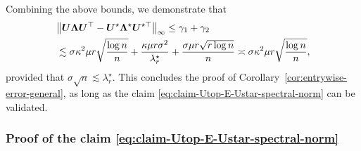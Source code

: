 



Combining the above bounds, we demonstrate that
%
\begin{align}
	& \big\|\bm{U}\bm{\Lambda}\bm{U}^{\top}-\bm{U}^{\star}\bm{\Lambda}^{\star}\bm{U}^{\star\top} \big\|_{\infty}
	\leq\gamma_{1}+\gamma_{2} \notag\\
& \lesssim\sigma\kappa^{2}\mu r\sqrt{\frac{\log n}{n}}+\frac{\kappa\mu r\sigma^{2}}{\lambda_{r}^{\star}}+\frac{\sigma\mu r\sqrt{r\log n}}{n}
  \asymp\sigma\kappa^{2}\mu r\sqrt{\frac{\log n}{n}},
\end{align}
%
provided that $\sigma\sqrt{n} \lesssim \lambda_r^{\star}$. This concludes the proof of Corollary~\ref{cor:entrywise-error-general}, as long as the claim \eqref{eq:claim-Utop-E-Ustar-spectral-norm} can be validated.




\subsubsection{Proof of the claim \eqref{eq:claim-Utop-E-Ustar-spectral-norm}}


